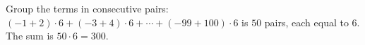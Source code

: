 Group the terms in consecutive pairs: $(-1+2)\cdot6+(-3+4)\cdot6+\cdots+(-99+100)\cdot6$ is $50$ pairs, each equal to $6$. The sum is $50\cdot6=\boxed{300}$.
